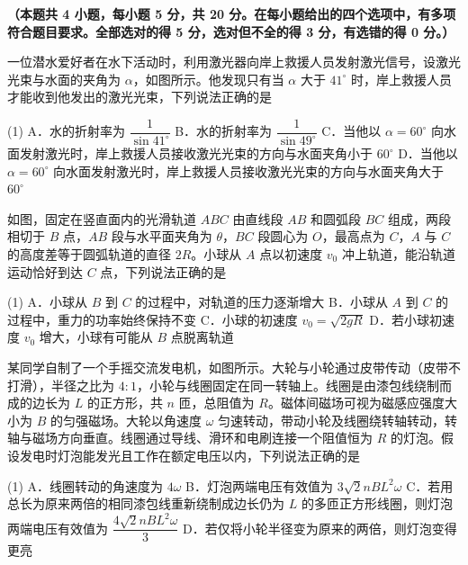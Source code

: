
\noindent\textbf{（本题共 4 小题，每小题 5 分，共 20 分。在每小题给出的四个选项中，有多项符合题目要求。全部选对的得 5 分，选对但不全的得 3 分，有选错的得 0 分。）}

\begin{question}
一位潜水爱好者在水下活动时，利用激光器向岸上救援人员发射激光信号，设激光光束与水面的夹角为 $\alpha$，如图所示。他发现只有当 $\alpha$ 大于 $41^{\circ}$ 时，岸上救援人员才能收到他发出的激光光束，下列说法正确的是\gkblank


\begin{gkopts}(1)
  \task A．水的折射率为 $\dfrac{1}{\sin41^{\circ}}$
  \task B．水的折射率为 $\dfrac{1}{\sin49^{\circ}}$
  \task C．当他以 $\alpha=60^{\circ}$ 向水面发射激光时，岸上救援人员接收激光光束的方向与水面夹角小于 $60^{\circ}$
  \task D．当他以 $\alpha=60^{\circ}$ 向水面发射激光时，岸上救援人员接收激光光束的方向与水面夹角大于 $60^{\circ}$
\end{gkopts}
\end{question}

\begin{question}
如图，固定在竖直面内的光滑轨道 $ABC$ 由直线段 $AB$ 和圆弧段 $BC$ 组成，两段相切于 $B$ 点，$AB$ 段与水平面夹角为 $\theta$，$BC$ 段圆心为 $O$，最高点为 $C$，$A$ 与 $C$ 的高度差等于圆弧轨道的直径 $2R$。小球从 $A$ 点以初速度 $v_{0}$ 冲上轨道，能沿轨道运动恰好到达 $C$ 点，下列说法正确的是\gkblank


\begin{gkopts}(1)
  \task A．小球从 $B$ 到 $C$ 的过程中，对轨道的压力逐渐增大
  \task B．小球从 $A$ 到 $C$ 的过程中，重力的功率始终保持不变
  \task C．小球的初速度 $v_{0}=\sqrt{2gR}$
  \task D．若小球初速度 $v_{0}$ 增大，小球有可能从 $B$ 点脱离轨道
\end{gkopts}
\end{question}

\begin{question}
某同学自制了一个手摇交流发电机，如图所示。大轮与小轮通过皮带传动（皮带不打滑），半径之比为 $4:1$，小轮与线圈固定在同一转轴上。线圈是由漆包线绕制而成的边长为 $L$ 的正方形，共 $n$ 匝，总阻值为 $R$。磁体间磁场可视为磁感应强度大小为 $B$ 的匀强磁场。大轮以角速度 $\omega$ 匀速转动，带动小轮及线圈绕转轴转动，转轴与磁场方向垂直。线圈通过导线、滑环和电刷连接一个阻值恒为 $R$ 的灯泡。假设发电时灯泡能发光且工作在额定电压以内，下列说法正确的是\gkblank


\begin{gkopts}(1)
  \task A．线圈转动的角速度为 $4\omega$
  \task B．灯泡两端电压有效值为 $3\sqrt{2}nBL^{2}\omega$
  \task C．若用总长为原来两倍的相同漆包线重新绕制成边长仍为 $L$ 的多匝正方形线圈，则灯泡两端电压有效值为 $\dfrac{4\sqrt{2}nBL^{2}\omega}{3}$
  \task D．若仅将小轮半径变为原来的两倍，则灯泡变得更亮
\end{gkopts}
\end{question}

